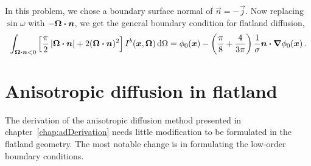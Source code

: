 In this problem, we chose a boundary surface normal of $\vec{n}=-\vec{j}$. Now
replacing $\sin \omega$ with $-\bm{\Omega}\bm{\cdot}\bm{n}$, we get the general
boundary condition for flatland diffusion,
\begin{equation} \label{eq:flatlandDiffusionVarBc}
\int_{\bm{\Omega}\bm{\cdot}\bm{n} < 0} \left[ \frac{\pi}{2}
\left| \bm{\Omega}\bm{\cdot}\bm{n} \right| + 2 (\bm{\Omega}\bm{\cdot}\bm{n})^2 \right]
I^b(\bm{x}, \bm{\Omega}) \mathop{}\!\mathrm{d}\Omega
= 
  \phi_0(\bm{x})
  - \left( \frac{\pi}{8} + \frac{4}{3\pi} \right) \frac{1}{\sigma}
  \bm{n}\bm{\cdot}\bm{\nabla} \phi_0(\bm{x})\,.
\end{equation}


\section{Anisotropic diffusion in flatland}
The derivation of the anisotropic diffusion method presented in
chapter~\ref{chap:adDerivation} needs little modification to be formulated
in the flatland geometry. The most notable change is in formulating the
low-order boundary conditions.

